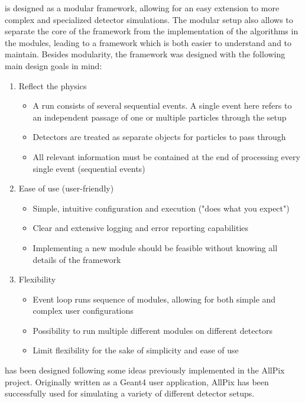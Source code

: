 \apsq is designed as a modular framework, allowing for an easy extension to more complex and specialized detector simulations.
The modular setup also allows to separate the core of the framework from the implementation of the algorithms in the modules, leading to a framework which is both easier to understand and to maintain.
Besides modularity, the \apsq framework was designed with the following main design goals in mind:
\begin{enumerate}
    \item Reflect the physics
    \begin{itemize}
        \item A run consists of several sequential events. A single event here refers to an independent passage of one or multiple particles through the setup
        \item Detectors are treated as separate objects for particles to pass through
        \item All relevant information must be contained at the end of processing every single event (sequential events)
    \end{itemize}
    \item Ease of use (user-friendly)
    \begin{itemize}
        \item Simple, intuitive configuration and execution ("does what you expect")
        \item Clear and extensive logging and error reporting capabilities
        \item Implementing a new module should be feasible without knowing all details of the framework
    \end{itemize}
    \item Flexibility
    \begin{itemize}
        \item Event loop runs sequence of modules, allowing for both simple and complex user configurations
        \item Possibility to run multiple different modules on different detectors
        \item Limit flexibility for the sake of simplicity and ease of use
    \end{itemize}
\end{enumerate}

\apsq has been designed following some ideas previously implemented in the AllPix~\cite{ap1wiki,ap1git} project.
Originally written as a Geant4 user application, AllPix has been successfully used for simulating a variety of different detector setups.

